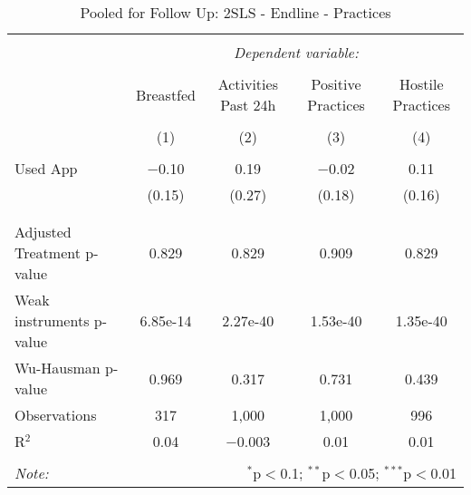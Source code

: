 
\begin{table}[!htbp] \centering 
  \caption{Pooled for Follow Up: 2SLS - Endline - Practices} 
  \label{tbl:Pooled for Follow Up: 2SLS - Endline - Practices} 
\begin{tabular}{@{\extracolsep{5pt}}lcccc} 
\\[-1.8ex]\hline 
\hline \\[-1.8ex] 
 & \multicolumn{4}{c}{\textit{Dependent variable:}} \\ 
\cline{2-5} 
\\[-1.8ex] & Breastfed & Activities Past 24h & Positive Practices & Hostile Practices \\ 
\\[-1.8ex] & (1) & (2) & (3) & (4)\\ 
\hline \\[-1.8ex] 
 Used App & $-$0.10 & 0.19 & $-$0.02 & 0.11 \\ 
  & (0.15) & (0.27) & (0.18) & (0.16) \\ 
  & & & & \\ 
\hline \\[-1.8ex] 
Adjusted Treatment p-value & 0.829 & 0.829 & 0.909 & 0.829 \\ 
Weak instruments p-value & 6.85e-14 & 2.27e-40 & 1.53e-40 & 1.35e-40 \\ 
Wu-Hausman p-value & 0.969 & 0.317 & 0.731 & 0.439 \\ 
Observations & 317 & 1,000 & 1,000 & 996 \\ 
R$^{2}$ & 0.04 & $-$0.003 & 0.01 & 0.01 \\ 
\hline 
\hline \\[-1.8ex] 
\textit{Note:}  & \multicolumn{4}{r}{$^{*}$p$<$0.1; $^{**}$p$<$0.05; $^{***}$p$<$0.01} \\ 
\end{tabular} 
\end{table} 
